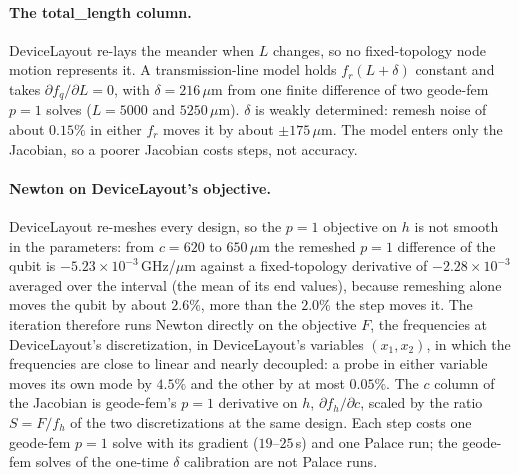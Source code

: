 \documentclass{anvil-paper}
\begin{document}
\paragraph{The total\_length column.}
DeviceLayout re-lays the meander when $L$ changes, so no fixed-topology
node motion represents it. A transmission-line model holds $f_r(L+\delta)$
constant and takes $\partial f_q/\partial L = 0$, with $\delta =
216\,\mu$m from one finite difference of two geode-fem $p = 1$ solves
($L = 5000$ and $5250\,\mu$m). $\delta$ is weakly determined: remesh noise
of about $0.15\%$ in either $f_r$ moves it by about $\pm175\,\mu$m. The
model enters only the Jacobian, so a poorer Jacobian costs steps, not
accuracy.

\paragraph{Newton on DeviceLayout's objective.}
DeviceLayout re-meshes every design, so the $p = 1$ objective on $h$ is not
smooth in the parameters: from $c = 620$ to $650\,\mu$m the remeshed
$p = 1$ difference of the qubit is $-5.23\times10^{-3}$\,GHz/$\mu$m
against a fixed-topology derivative of $-2.28\times10^{-3}$ averaged over
the interval (the mean of its end values), because remeshing alone moves
the qubit by about $2.6\%$, more than the $2.0\%$ the step moves it. The
iteration therefore runs Newton directly on the objective $F$, the
frequencies at DeviceLayout's discretization,
in DeviceLayout's variables $(x_1, x_2)$, in which the frequencies are
close to linear and nearly decoupled: a probe in either variable moves its
own mode by $4.5\%$ and the other by at most $0.05\%$. The $c$ column of
the Jacobian is geode-fem's $p = 1$ derivative on $h$, $\partial f_h/\partial c$, scaled by the
ratio $S = F/f_h$ of the two discretizations at the same design. Each step costs one geode-fem
$p = 1$ solve with its gradient ($19$--$25$\,s) and one Palace run; the
geode-fem solves of the one-time $\delta$ calibration are not Palace runs.
\end{document}
